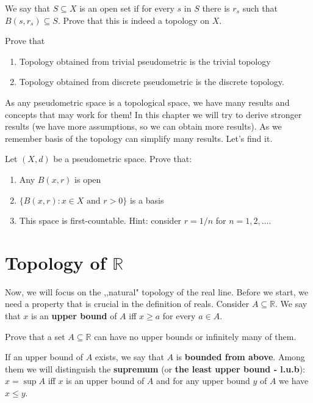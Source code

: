 \begin{prob}
	We say that $S\subseteq X$ is an open set if for every $s$ in $S$ there is $r_s$ such that $B(s,r_s)\subseteq S$.
	Prove that this is indeed a topology on $X$.
\end{prob}

\begin{prob}
	Prove that
	\begin{enumerate}
		\item Topology obtained from trivial pseudometric is the trivial topology
		\item Topology obtained from discrete pseudometric is the discrete topology.
	\end{enumerate}
\end{prob}

As any pseudometric space is a topological space, we have many results and concepts that may work for them! In this chapter we will try to derive
stronger results (we have more assumptions, so we can obtain more results). As we remember basis of the topology can simplify many results. Let's
find it.

\begin{prob}
	Let $(X,d)$ be a pseudometric space. Prove that:
	\begin{enumerate}
		\item Any $B(x,r)$ is open
		\item $\{B(x,r) : x\in X \text{ and }r > 0\}$ is a basis
		\item This space is first-countable. Hint: consider $r=1/n$ for $n=1,2,\dots$.
	\end{enumerate}
\end{prob}

\section{Topology of $\mathbb R$}
Now, we will focus on the ,,natural" topology of the real line.
Before we start, we need a property that is crucial in the definition
of reals. Consider $A\subseteq \mathbb R$. We say that $x$ is an
\textbf{upper bound} of $A$ iff $x\ge a$ for every $a\in A$.

\begin{prob}
  Prove that a set $A\subseteq \mathbb R$ can have no upper bounds
  or infinitely many of them.
\end{prob}

\noindent If an upper bound of $A$ exists, we say that $A$ is
\textbf{bounded from above}. Among them we will distinguish the
\textbf{supremum} (or \textbf{the least upper bound - l.u.b}):
$x=\sup A$ iff $x$ is an upper bound of $A$ and for any upper bound
$y$ of $A$ we have $x\le y$.

